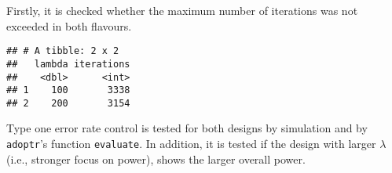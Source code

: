 \documentclass[
]{book}
\newenvironment{Shaded}{\begin{snugshade}}{\end{snugshade}}
\newcommand{\DataTypeTok}[1]{\textcolor[rgb]{0.13,0.29,0.53}{#1}}
\newcommand{\KeywordTok}[1]{\textcolor[rgb]{0.13,0.29,0.53}{\textbf{#1}}}
\newcommand{\NormalTok}[1]{#1}
\newcommand{\OperatorTok}[1]{\textcolor[rgb]{0.81,0.36,0.00}{\textbf{#1}}}
\newcommand{\StringTok}[1]{\textcolor[rgb]{0.31,0.60,0.02}{#1}}
\begin{document}
Firstly, it is checked whether the maximum number of iterations was not
exceeded in both flavours.

\begin{Shaded}
\end{Shaded}

\begin{verbatim}
## # A tibble: 2 x 2
##   lambda iterations
##    <dbl>      <int>
## 1    100       3338
## 2    200       3154
\end{verbatim}

Type one error rate control is tested for both designs by simulation and by
\texttt{adoptr}'s function \texttt{evaluate}.
In addition, it is tested if the design with larger \(\lambda\) (i.e.,
stronger focus on power), shows the larger overall power.
\end{document}
